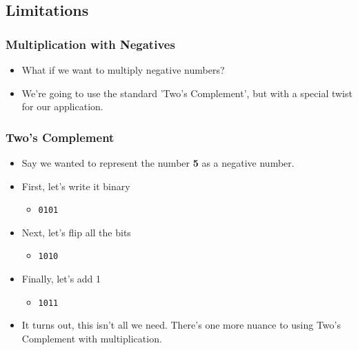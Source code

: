 \documentclass{beamer}
\begin{document}
    	

		\subsection{Limitations}    	
    	
		\begin{frame}
    		\frametitle{Multiplication with Negatives}
    		\begin{itemize}
    			\item What if we want to multiply negative numbers?
    			\item We're going to use the standard 'Two's Complement', but with a special twist for our application.
    			
    		\end{itemize}
    	\end{frame}
    	
    	\begin{frame}
    		\frametitle{Two's Complement}
    		\begin{itemize}
    			\item Say we wanted to represent the number \textbf{5} as a negative number.
    			\item First, let's write it binary
    			\begin{itemize}
    				\item \texttt{0101}
    			\end{itemize}
    			\item Next, let's flip all the bits
    			\begin{itemize}
    				\item \texttt{1010}
    			\end{itemize}
    			\item Finally, let's add 1
    			\begin{itemize}
    				\item \texttt{1011}
    			\end{itemize}
    			
    			\item It turns out, this isn't all we need. There's one more nuance to using Two's Complement with multiplication.
    			
    		\end{itemize}
    	\end{frame}  
    	
\end{document}
